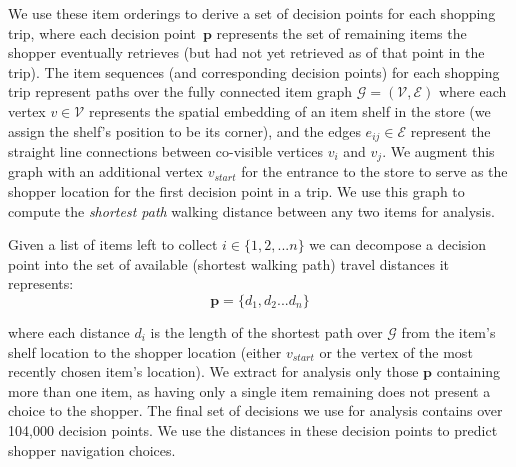 \documentclass[aps,pre,twocolumn,groupedaddress]{revtex4-2}
\begin{document}
We use these item orderings to derive a set of decision points for each shopping trip, where each decision point~$\mathbf{p}$ represents the set of remaining items the shopper eventually retrieves (but had not yet retrieved as of that point in the trip). 
%
The item sequences (and corresponding decision points) for each shopping trip represent paths over the fully connected item graph $\mathcal{G} = (\mathcal{V},\mathcal{E})$ where each vertex $v\in\mathcal{V}$ represents the spatial embedding of an item shelf in the store (we assign the shelf's position to be its corner), and the edges $e_{ij}\in\mathcal{E}$ represent the straight line connections between co-visible vertices $v_{i}$ and $v_{j}$. We augment this graph with an additional vertex $v_{start}$ for the entrance to the store to serve as the shopper location for the first decision point in a trip. We use this graph to compute the \textit{shortest path} walking distance between any two items for analysis.

Given a list of items left to collect $i \in \{1,2,...n\}$ we can decompose a decision point into the set of available (shortest walking path) travel distances it represents:
\begin{equation}
\mathbf{p} = \{d_{1},d_{2}...d_{n}\}
\label{eq:entropy:d}
\end{equation}
 
\noindent where each distance $d_i$ is the length of the shortest path over $\mathcal{G}$ from the item's shelf location to the shopper location (either $v_{start}$ or the vertex of the most recently chosen item's location).  We extract for analysis only those $\mathbf{p}$ containing more than one item, as having only a single item remaining does not present a choice to the shopper. The final set of decisions we use for analysis contains over 104,000 decision points. We use the distances in these decision points to predict shopper navigation choices.
\end{document}
